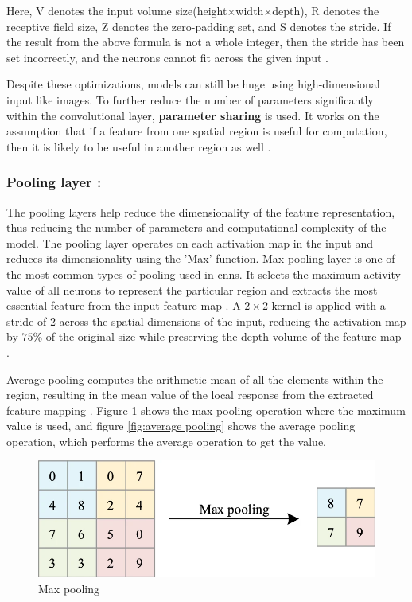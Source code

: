 Here, V denotes the input volume size(height$\times$width$\times$depth), R denotes the receptive field size, Z denotes the zero-padding set, and S denotes the stride. If the result from the above formula is not a whole integer, then the stride has been set incorrectly, and the neurons cannot fit across the given input \cite{oshea2015introductionconvolutionalneuralnetworks}.

Despite these optimizations, models can still be huge using high-dimensional input like images. To further reduce the number of parameters significantly within the convolutional layer, \textbf{parameter sharing} is used. It works on the assumption that if a feature from one spatial region is useful for computation, then it is likely to be useful in another region as well \cite{oshea2015introductionconvolutionalneuralnetworks}.

\subsubsection*{Pooling layer :}

The pooling layers help reduce the dimensionality of the feature representation, thus reducing the number of parameters and computational complexity of the model. The pooling layer operates on each activation map in the input and reduces its dimensionality using the 'Max' function. Max-pooling layer is one of the most common types of pooling used in \glspl{cnn}. It selects the maximum activity value of all neurons to represent the particular region and extracts the most essential feature from the input feature map \cite{Zhao2024}. A $2\times2$ kernel is applied with a stride of 2 across the spatial dimensions of the input, reducing the activation map by $75\%$ of the original size while preserving the depth volume of the feature map \cite{oshea2015introductionconvolutionalneuralnetworks}. 

Average pooling computes the arithmetic mean of all the elements within the region, resulting in the mean value of the local response from the extracted feature mapping \cite{Zhao2024}. Figure \ref{fig:max pooling} shows the max pooling operation where the maximum value is used, and figure \ref{fig:average pooling} shows the average pooling operation, which performs the average operation to get the value.

\begin{figure}[H]
    \centering
    \includegraphics[width=1\linewidth]{Rohit_Master_Thesis//Images/max_pooling.png}
    \caption{Max pooling \cite{Zhao2024}}
    \label{fig:max pooling}
\end{figure}

